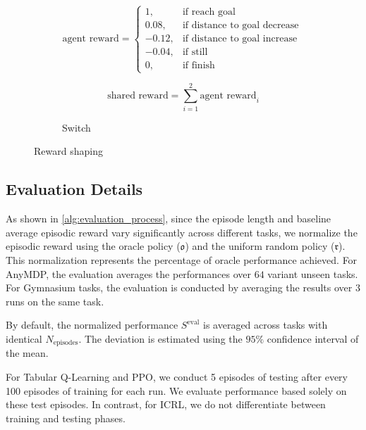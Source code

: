 \documentclass{article}
\begin{document}
\begin{figure}[h]
    \begin{subfigure}{0.45\columnwidth}
        \begin{equation}
            \text{agent reward} = \begin{cases}
                1, & \text{if reach goal} \\
                0.08, & \text{if distance to goal decrease} \\
                -0.12, & \text{if distance to goal increase } \\
                -0.04, & \text{if still } \\
                0, & \text{if finish} 
            \end{cases} \nonumber
        \end{equation}
        
        \begin{equation}
            \text{shared reward} = \sum_{i=1}^{2} \text{agent reward}_i \nonumber
        \end{equation}
        \caption{Switch}
        \label{fig:reward_shaping_switch}
    \end{subfigure}
\caption{Reward shaping}
\label{fig:reward_shaping}
\end{figure}

\subsection{Evaluation Details} \label{sec:evaluation_detail}
As shown in \cref{alg:evaluation_process}, since the episode length and baseline average episodic reward vary significantly across different tasks, we normalize the episodic reward using the oracle policy ($\mathfrak{o}$) and the uniform random policy ($\mathfrak{r}$). This normalization represents the percentage of oracle performance achieved. For AnyMDP, the evaluation averages the performances over $64$ variant unseen tasks. For Gymnasium tasks, the evaluation is conducted by averaging the results over $3$ runs on the same task. 

By default, the normalized performance $ S^{\text{eval}} $ is averaged across tasks with identical $ N_{\text{episodes}} $. The deviation is estimated using the $95\%$ confidence interval of the mean.

For Tabular Q-Learning and PPO, we conduct 5 episodes of testing after every 100 episodes of training for each run. We evaluate performance based solely on these test episodes. In contrast, for ICRL, we do not differentiate between training and testing phases.
\end{document}
